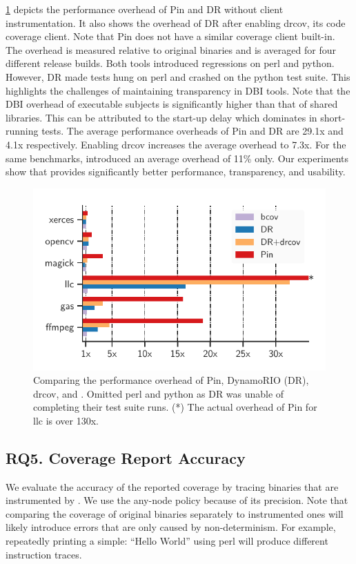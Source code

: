 \cref{fig:dbi-tools-comparison} depicts the performance overhead of Pin and DR without client instrumentation.
It also shows the overhead of DR after enabling \textsf{drcov}, its code coverage client.
Note that Pin does not have a similar coverage client built-in.
The overhead is measured relative to original binaries and is averaged for four different release builds.
Both tools introduced regressions on \textsf{perl} and \textsf{python}.
However, DR made tests hung on \textsf{perl} and crashed on the \textsf{python} test suite. 
This highlights the challenges of maintaining transparency in DBI tools. 
Note that the DBI overhead of executable subjects is significantly higher than that of shared libraries. 
This can be attributed to the start-up delay which dominates in short-running tests.
The average performance overheads of Pin and DR are 29.1x and 4.1x respectively.
Enabling \textsf{drcov} increases the average overhead to 7.3x.
For the same benchmarks, {\bcov} introduced an average overhead of 11\% only.
Our experiments show that {\bcov} provides significantly better performance, transparency, and usability. 


\begin{figure}[t!]
    \centering
    \includegraphics[clip, trim=0.48cm 0.4cm 0.49cm 0.73cm, width=0.9\columnwidth]{fig/dbi-overhead.pdf}
    \caption{Comparing the performance overhead of Pin, DynamoRIO (DR), \textsf{drcov}, and {\bcov}. Omitted \textsf{perl} and \textsf{python} as DR was  unable of completing their test suite runs. 
        (*) The actual overhead of Pin for \textsf{llc} is over 130x.}
    \label{fig:dbi-tools-comparison}
\end{figure}


\subsection*{RQ5. Coverage Report Accuracy}
We evaluate the accuracy of the reported coverage by tracing binaries that are instrumented by {\bcov}. 
We use the any-node policy because of its precision.
Note that comparing the coverage of original binaries separately to instrumented ones will likely introduce errors that are only caused by non-determinism.
For example, repeatedly printing a simple: ``Hello World'' using \textsf{perl} will produce different instruction traces.




